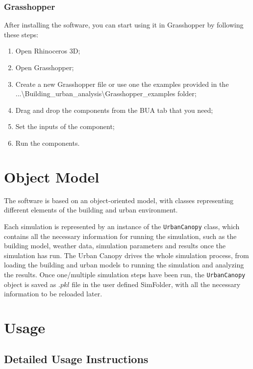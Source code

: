 \documentclass[a4paper,12pt]{article} %
\begin{document}
    \subsubsection{Grasshopper}
    After installing the software, you can start using it in Grasshopper by following these steps:
    \begin{enumerate}
        \item Open Rhinoceros 3D;
        \item Open Grasshopper;
        \item Create a new Grasshopper file or use one the examples provided in the ...\textbackslash Building\_urban\_analysis\textbackslash Grasshopper\_examples folder;
        \item Drag and drop the components from the BUA tab that you need;
        \item Set the inputs of the component;
        \item Run the components.
    \end{enumerate}



\section{Object Model}
The software is based on an object-oriented model, with classes representing different elements of the building and urban environment.

Each simulation is represented by an instance of the \texttt{UrbanCanopy} class, which contains all the necessary information for running the simulation, such as the building model, weather data, simulation parameters and results once the simulation has run.
The Urban Canopy drives the whole simulation process, from loading the building and urban models to running the simulation and analyzing the results. Once one/multiple simulation steps have been run, the \texttt{UrbanCanopy} object is saved as $.pkl$ file in the user defined \gls{SimFolder}, with all the necessary information to be reloaded later.

    \section{Usage}

    \subsection{Detailed Usage Instructions}
\end{document}
